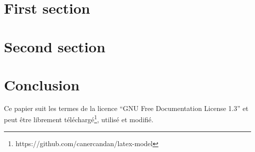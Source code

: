 %





\maketitle

\begin{abstract}


\end{abstract}

\section{First section}


\section{Second section}


\section{Conclusion}

Ce papier suit les termes de la licence ``GNU Free Documentation License 1.3'' et peut être librement téléchargé\footnote{https://github.com/canercandan/latex-model}, utilisé et modifié.


